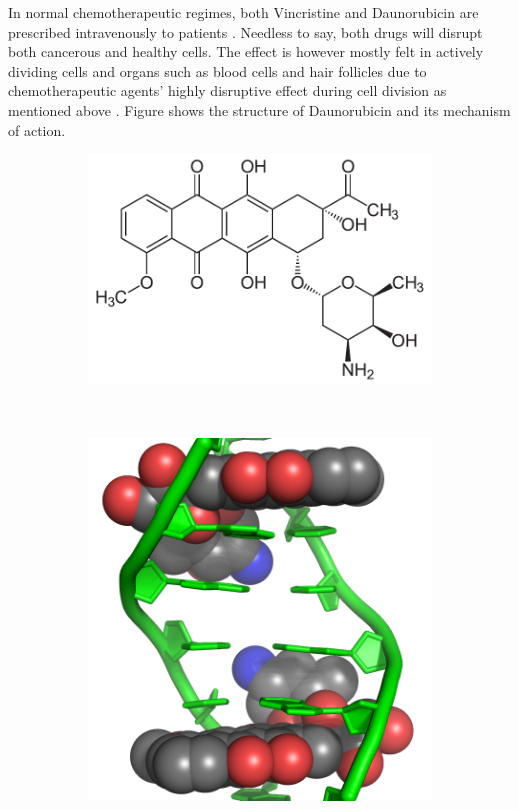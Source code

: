 \documentclass[pdftex,12pt,a4paper]{report}
\begin{document}
In normal chemotherapeutic regimes, both Vincristine and Daunorubicin are prescribed intravenously to patients \cite{skeel2011handbook}. Needless to say, both drugs will disrupt both cancerous and healthy cells. The effect is however mostly felt in actively dividing cells and organs such as blood cells and hair follicles due to chemotherapeutic agents' highly disruptive effect during cell division as mentioned above \cite{skeel2011handbook, mayo2018chemotherapy}. Figure \cite{yang2014doxorubicin} shows the structure of Daunorubicin and its mechanism of action.

\begin{figure}[H]
\begin{subfigure}{.55\textwidth}
  \centering
  \includegraphics[width=\textwidth]{images/daunorubicin}
  \caption{}
  \label{fig:dauno}
\end{subfigure}
~
\begin{subfigure}{.4\textwidth}
  \centering
  \includegraphics[width=\textwidth]{images/doxorubicin_dna}

\end{subfigure}
\end{figure}
\end{document}
